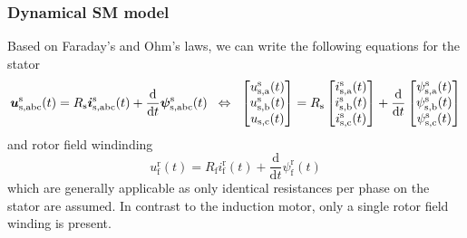 \begin{frame}
	\frametitle{Dynamical SM model}
    Based on Faraday's and Ohm's laws, we can write the following equations for the stator 
    \begin{equation}
            \bm{u}^\mathrm{s}_\mathrm{s,abc}(t) = R_\mathrm{s}\bm{i}^\mathrm{s}_\mathrm{s,abc}(t)+\frac{\mathrm{d}}{\mathrm{d}t}\bm{\psi}^\mathrm{s}_\mathrm{s,abc}(t) \hspace{0.2cm} \Leftrightarrow \hspace{0.2cm} \begin{bmatrix}
                u_{\mathrm{s,a}}^\mathrm{s}(t)\\
                u_{\mathrm{s,b}}^\mathrm{s}(t)\\
                u_{\mathrm{s,c}}(t)\\
            \end{bmatrix} = R_\mathrm{s} \begin{bmatrix}
                i_{\mathrm{s,a}}^\mathrm{s}(t)\\
                i_{\mathrm{s,b}}^\mathrm{s}(t)\\
                i_{\mathrm{s,c}}^\mathrm{s}(t)\\
            \end{bmatrix} + \frac{\mathrm{d}}{\mathrm{d}t} \begin{bmatrix}
                \psi_{\mathrm{s,a}}^\mathrm{s}(t)\\
                \psi_{\mathrm{s,b}}^\mathrm{s}(t)\\
                \psi_{\mathrm{s,c}}^\mathrm{s}(t)\\
            \end{bmatrix}
            \label{eq:SM_stator_three_phase_voltage_equation}
    \end{equation}
    \pause
    and rotor field windinding
    \begin{equation}
            u^\mathrm{r}_\mathrm{f}(t) = R_\mathrm{f}i^\mathrm{r}_\mathrm{f}(t)+\frac{\mathrm{d}}{\mathrm{d}t}\psi^\mathrm{r}_\mathrm{f}(t) 
            \label{eq:SM_rotor_voltage_equation}
    \end{equation}
which are generally applicable as only identical resistances per phase on the stator are assumed. \pause In contrast to the induction motor, only a single rotor field winding is present.
\end{frame}

